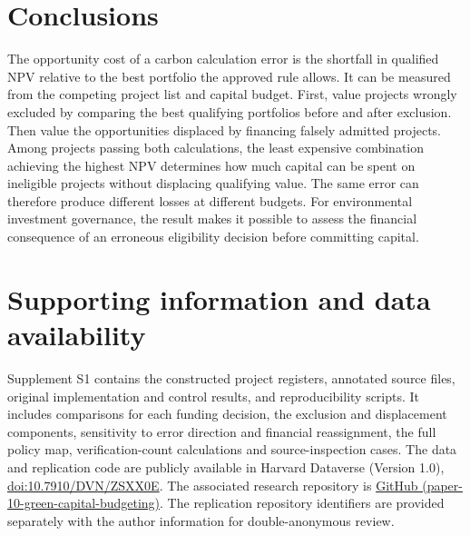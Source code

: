 \section{Conclusions}
The opportunity cost of a carbon calculation error is the shortfall in qualified NPV relative to the best portfolio the approved rule allows. It can be measured from the competing project list and capital budget. First, value projects wrongly excluded by comparing the best qualifying portfolios before and after exclusion. Then value the opportunities displaced by financing falsely admitted projects. Among projects passing both calculations, the least expensive combination achieving the highest NPV determines how much capital can be spent on ineligible projects without displacing qualifying value. The same error can therefore produce different losses at different budgets. For environmental investment governance, the result makes it possible to assess the financial consequence of an erroneous eligibility decision before committing capital.

\section*{Supporting information and data availability}
Supplement S1 contains the constructed project registers, annotated source files, original implementation and control results, and reproducibility scripts. It includes comparisons for each funding decision, the exclusion and displacement components, sensitivity to error direction and financial reassignment, the full policy map, verification-count calculations and source-inspection cases. \ifdefined\readingcopy
The data and replication code are publicly available in Harvard Dataverse (Version 1.0), \href{https://doi.org/10.7910/DVN/ZSXX0E}{doi:10.7910/DVN/ZSXX0E}. The associated research repository is \href{https://github.com/Meshaal-Mouawad/paper-10-green-capital-budgeting}{GitHub (paper-10-green-capital-budgeting)}.
\else
The replication repository identifiers are provided separately with the author information for double-anonymous review.
\fi
